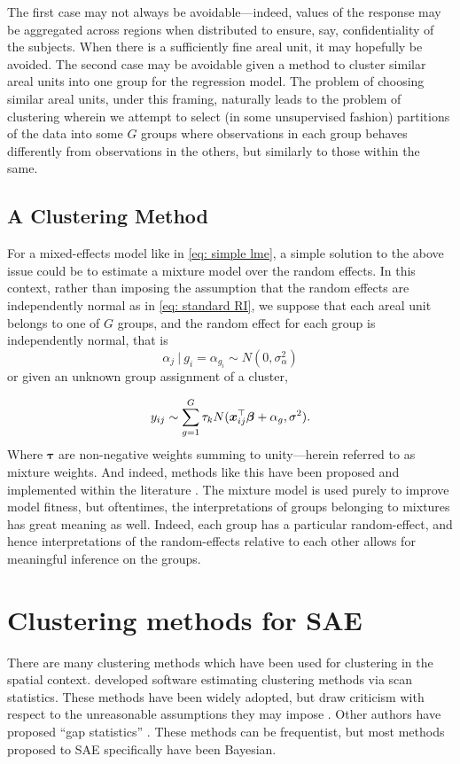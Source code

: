 \documentclass[twoside,12pt,bibstyle=chem-acs]{reedthesis}
\begin{document}
The first case may not always be avoidable---indeed, values of the response may be aggregated across regions when distributed to ensure, say, confidentiality of the subjects. When there is a sufficiently fine areal unit, it may hopefully be avoided.
The second case may be avoidable given a method to cluster similar areal units into one group for the regression model.
The problem of choosing similar areal units, under this framing, naturally leads to the problem of clustering wherein we attempt to select (in some unsupervised fashion) partitions of the data into some $G$ groups where observations in each group behaves differently from observations in the others, but similarly to those within the same.

\subsection{A Clustering Method}
\label{sbsc: simple clustering}
For a mixed-effects model like in \autoref{eq: simple lme}, a simple solution to the above issue could be to estimate a mixture model over the random effects. In this context, rather than imposing the assumption that the random effects are independently normal as in \autoref{eq: standard RI}, we suppose that each areal unit belongs to one of $G$ groups, and the random effect for each group is independently normal, that is
\begin{equation}
\alpha_j ~|~ g_i = \alpha_{g_i} \sim N(0, \sigma^2_\alpha) %
\end{equation}
or given an unknown group assignment of a cluster,
\addtocounter{equation}{-1}
\begin{equation}
y_{ij} \sim \sum_{g=1}^G \tau_k N(\bm{x}_{ij}^\top \bm\beta + \alpha_g, \sigma^2).
\label{eq: lm-mm}
\end{equation}
Where $\bm\tau$ are non-negative weights summing to unity---herein referred to as mixture weights. And indeed, methods like this have been proposed and implemented within the literature \cite{proust_estimation_2005,verbeke_linear_1996}. The mixture model is used purely to improve model fitness, but oftentimes, the interpretations of groups belonging to mixtures has great meaning as well. Indeed, each group has a particular random-effect, and hence interpretations of the random-effects relative to each other allows for meaningful inference on the groups.

\section{Clustering methods for SAE}
\label{sec: clustering}
There are many clustering methods which have been used for clustering in the spatial context. \citeauthor{kulldorff_satscan_1997} developed software estimating clustering methods via scan statistics. These methods have been widely adopted, but draw criticism with respect to the unreasonable assumptions they may impose \cite{wakefield_bayesian_2013}. Other authors have proposed ``gap statistics'' \cite{tibshirani_estimating_2001}. These methods can be frequentist, but most methods proposed to SAE specifically have been Bayesian. 
\end{document}
